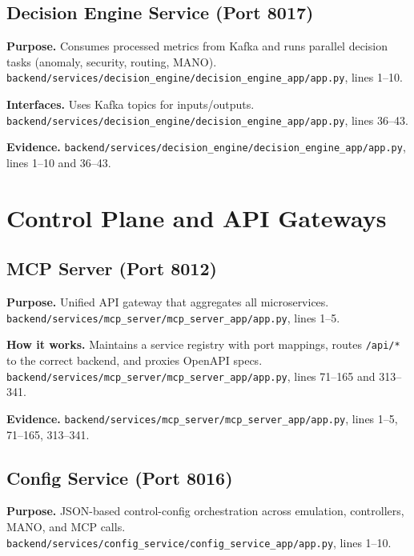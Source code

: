 \documentclass[10pt,a4paper]{article}
\begin{document}
\subsection{Decision Engine Service (Port 8017)}

\textbf{Purpose.} Consumes processed metrics from Kafka and runs parallel decision tasks (anomaly, security, routing, MANO). \texttt{backend/services/decision\_engine/decision\_engine\_app/app.py}, lines 1--10.

\textbf{Interfaces.} Uses Kafka topics for inputs/outputs. \texttt{backend/services/decision\_engine/decision\_engine\_app/app.py}, lines 36--43.

\textbf{Evidence.} \texttt{backend/services/decision\_engine/decision\_engine\_app/app.py}, lines 1--10 and 36--43.

\section{Control Plane and API Gateways}

\subsection{MCP Server (Port 8012)}

\textbf{Purpose.} Unified API gateway that aggregates all microservices. \texttt{backend/services/mcp\_server/mcp\_server\_app/app.py}, lines 1--5.

\textbf{How it works.} Maintains a service registry with port mappings, routes \texttt{/api/*} to the correct backend, and proxies OpenAPI specs. \texttt{backend/services/mcp\_server/mcp\_server\_app/app.py}, lines 71--165 and 313--341.

\textbf{Evidence.} \texttt{backend/services/mcp\_server/mcp\_server\_app/app.py}, lines 1--5, 71--165, 313--341.

\subsection{Config Service (Port 8016)}

\textbf{Purpose.} JSON-based control-config orchestration across emulation, controllers, MANO, and MCP calls. \texttt{backend/services/config\_service/config\_service\_app/app.py}, lines 1--10.
\end{document}
